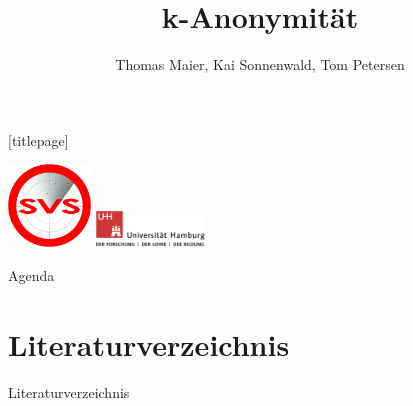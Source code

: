 \documentclass[t]{beamer}
\title{k-Anonymität}
\author[]{Thomas Maier, Kai Sonnenwald, Tom Petersen}
\institute[Uni Hamburg]{Universität Hamburg\\ Fachbereich Informatik}
\date{}
\begin{document}
\begingroup
	[titlepage]
	\begin{frame}[plain]
		\vskip8mm
		\includegraphics[width=2.2cm]{pic/svs_logo_hires-ohne-was.png}
		\titlepage
		\vspace{\fill}
		\includegraphics[width=2.9cm]{pic/UHH-Logo_2010_Farbe_RGB_hires_nomargin.png}
		\vskip20pt
	\end{frame}
\endgroup

\begin{frame}{Agenda}
	\tableofcontents
\end{frame}









\section{Literaturverzeichnis}

\begin{frame}{Literaturverzeichnis}
\nocite{*}


\end{frame}
\end{document}
